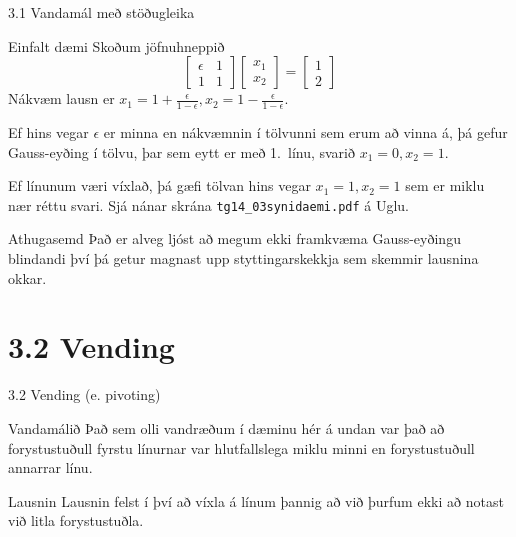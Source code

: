 \begin{frame}{3.1 Vandamál með stöðugleika} 
\begin{block}{Einfalt dæmi}
 Skoðum jöfnuhneppið
$$
\left[\begin{array}{ll}
\epsilon & 1\\
1 & 1
\end{array}\right] \left[\begin{array}{l}
x_1\\
x_2
\end{array}\right] 
=\left[\begin{array}{l}
1\\
2
\end{array}\right]
$$
\pause
Nákvæm lausn er $x_1=1+\frac{\epsilon}{1-\epsilon}, 
x_2=1-\frac{\epsilon}{1-\epsilon}$. \pause

Ef hins vegar $\epsilon$ er minna en nákvæmnin í tölvunni sem erum að vinna á, þá 
gefur Gauss-eyðing í tölvu, þar sem eytt er með 1.~línu, svarið $x_1 = 0, x_2 = 1$. \pause

Ef línunum væri víxlað, þá gæfi tölvan hins vegar $x_1=1, x_2=1$ sem er miklu nær réttu svari.
Sjá nánar skrána {\tt tg14\_03synidaemi.pdf} á Uglu. 
\end{block}

\pause

\begin{block}{Athugasemd}
 Það er alveg ljóst að megum ekki framkvæma Gauss-eyðingu blindandi því þá getur
magnast upp styttingarskekkja sem skemmir lausnina okkar.
\end{block}
\end{frame}

\section*{3.2 Vending}

\begin{frame}{3.2 Vending (e. pivoting)}
 \begin{block}{Vandamálið}
  Það sem olli vandræðum í dæminu hér á undan var það að forystustuðull
fyrstu línurnar var hlutfallslega miklu minni en forystustuðull annarrar línu.
 \end{block}

\begin{block}{Lausnin}
 Lausnin felst í því að víxla á línum þannig að við þurfum ekki að notast
við litla forystustuðla.
\end{block}
\end{frame}

